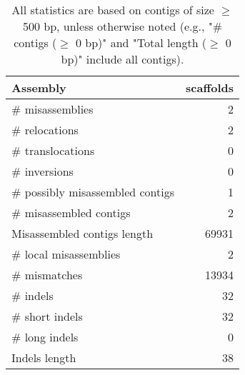 \documentclass[12pt,a4paper]{article}
\begin{document}
\begin{table}[ht]
\begin{center}
\caption{All statistics are based on contigs of size $\geq$ 500 bp, unless otherwise noted (e.g., "\# contigs ($\geq$ 0 bp)" and "Total length ($\geq$ 0 bp)" include all contigs).}
\begin{tabular}{|l*{1}{|r}|}
\hline
Assembly & scaffolds \\ \hline
\# misassemblies & 2 \\ \hline
\hspace{5mm}\# relocations & 2 \\ \hline
\hspace{5mm}\# translocations & 0 \\ \hline
\hspace{5mm}\# inversions & 0 \\ \hline
\# possibly misassembled contigs & 1 \\ \hline
\# misassembled contigs & 2 \\ \hline
Misassembled contigs length & 69931 \\ \hline
\# local misassemblies & 2 \\ \hline
\# mismatches & 13934 \\ \hline
\# indels & 32 \\ \hline
\hspace{5mm}\# short indels & 32 \\ \hline
\hspace{5mm}\# long indels & 0 \\ \hline
Indels length & 38 \\ \hline
\end{tabular}
\end{center}
\end{table}
\end{document}
